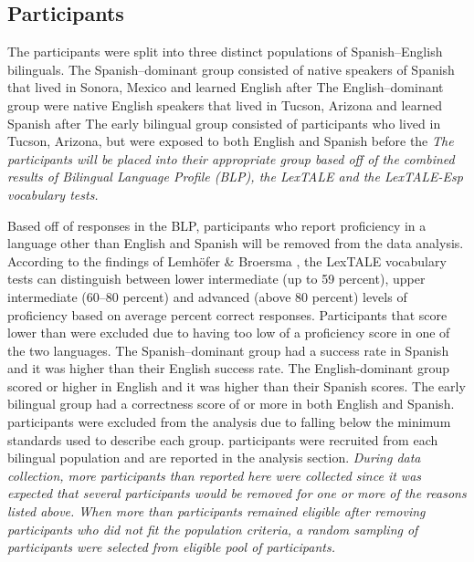 \documentclass[
12pt, %
english, %
doublespacing, %
nolistspacing, %
liststotoc, %
headsepline, %
chapterinoneline, %
openany, %
]{DoctoralThesis}\usepackage[]{graphicx}\usepackage[]{color}
\begin{document}
\subsection{Participants}

The participants were split into three distinct populations of Spanish–English bilinguals. The Spanish–dominant group consisted of native speakers of Spanish that lived in Sonora, Mexico and learned English after %
The English–dominant group were native English speakers that lived in Tucson, Arizona and learned Spanish after%
The early bilingual group consisted of participants who lived in Tucson, Arizona, but were exposed to both English and Spanish before the %
\emph{The participants will be placed into their appropriate group based off of the combined results of Bilingual Language Profile (BLP), the LexTALE and the LexTALE-Esp vocabulary tests.} 

Based off of responses in the BLP, participants who report proficiency in a language other than English and Spanish will be removed from the data analysis. According to the findings of Lemhöfer \& Broersma \parencite*{Lemhofer2012-hz}, the LexTALE vocabulary tests can distinguish between lower intermediate (up to 59 percent), upper intermediate (60–80 percent) and advanced (above 80 percent) levels of proficiency based on average percent correct responses. Participants that score lower than %
were excluded due to having too low of a proficiency score in one of the two languages. The Spanish–dominant group had a %
success rate in Spanish and it was higher than their English success rate. The English-dominant group scored %
or higher in English and it was higher than their Spanish scores. The early bilingual group had a correctness score of %
or more in both English and Spanish. %
participants were excluded from the analysis due to falling below the minimum standards used to describe each group. %
participants were recruited from each bilingual population and are reported in the analysis section. 
\emph{During data collection, more participants than reported here were collected since it was expected that several participants would be removed for one or more of the reasons listed above. When more than %
participants remained eligible after removing participants who did not fit the population criteria, a random sampling of %
participants were selected from eligible pool of participants.}
\end{document}
